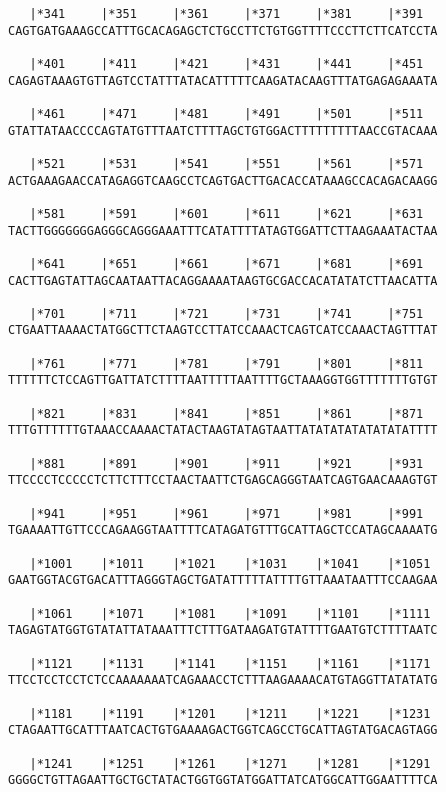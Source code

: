 \documentclass{article}
\begin{document}
\begin{Verbatim}
   |*341     |*351     |*361     |*371     |*381     |*391  
CAGTGATGAAAGCCATTTGCACAGAGCTCTGCCTTCTGTGGTTTTCCCTTCTTCATCCTA
  
   |*401     |*411     |*421     |*431     |*441     |*451  
CAGAGTAAAGTGTTAGTCCTATTTATACATTTTTCAAGATACAAGTTTATGAGAGAAATA
  
   |*461     |*471     |*481     |*491     |*501     |*511  
GTATTATAACCCCAGTATGTTTAATCTTTTAGCTGTGGACTTTTTTTTTAACCGTACAAA
  
   |*521     |*531     |*541     |*551     |*561     |*571  
ACTGAAAGAACCATAGAGGTCAAGCCTCAGTGACTTGACACCATAAAGCCACAGACAAGG
  
   |*581     |*591     |*601     |*611     |*621     |*631  
TACTTGGGGGGGAGGGCAGGGAAATTTCATATTTTATAGTGGATTCTTAAGAAATACTAA
  
   |*641     |*651     |*661     |*671     |*681     |*691  
CACTTGAGTATTAGCAATAATTACAGGAAAATAAGTGCGACCACATATATCTTAACATTA
  
   |*701     |*711     |*721     |*731     |*741     |*751  
CTGAATTAAAACTATGGCTTCTAAGTCCTTATCCAAACTCAGTCATCCAAACTAGTTTAT
  
   |*761     |*771     |*781     |*791     |*801     |*811  
TTTTTTCTCCAGTTGATTATCTTTTAATTTTTAATTTTGCTAAAGGTGGTTTTTTTGTGT
  
   |*821     |*831     |*841     |*851     |*861     |*871  
TTTGTTTTTTGTAAACCAAAACTATACTAAGTATAGTAATTATATATATATATATATTTT
  
   |*881     |*891     |*901     |*911     |*921     |*931  
TTCCCCTCCCCCTCTTCTTTCCTAACTAATTCTGAGCAGGGTAATCAGTGAACAAAGTGT
  
   |*941     |*951     |*961     |*971     |*981     |*991  
TGAAAATTGTTCCCAGAAGGTAATTTTCATAGATGTTTGCATTAGCTCCATAGCAAAATG
  
   |*1001    |*1011    |*1021    |*1031    |*1041    |*1051 
GAATGGTACGTGACATTTAGGGTAGCTGATATTTTTATTTTGTTAAATAATTTCCAAGAA
  
   |*1061    |*1071    |*1081    |*1091    |*1101    |*1111 
TAGAGTATGGTGTATATTATAAATTTCTTTGATAAGATGTATTTTGAATGTCTTTTAATC
  
   |*1121    |*1131    |*1141    |*1151    |*1161    |*1171 
TTCCTCCTCCTCTCCAAAAAAATCAGAAACCTCTTTAAGAAAACATGTAGGTTATATATG
  
   |*1181    |*1191    |*1201    |*1211    |*1221    |*1231 
CTAGAATTGCATTTAATCACTGTGAAAAGACTGGTCAGCCTGCATTAGTATGACAGTAGG
  
   |*1241    |*1251    |*1261    |*1271    |*1281    |*1291 
GGGGCTGTTAGAATTGCTGCTATACTGGTGGTATGGATTATCATGGCATTGGAATTTTCA
  

\end{Verbatim}
\end{document}
